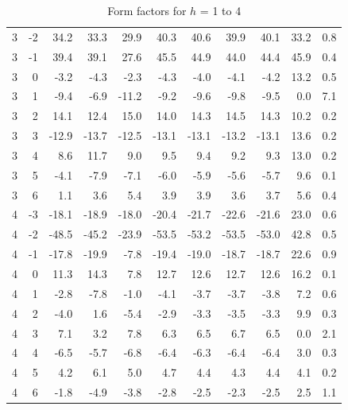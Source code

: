 \begin{table}[htbp]
\begin{tabular}{rrrrrrrrrrr}
3 & -2 & 34.2 & 33.3 & 29.9 & 40.3 & 40.6 & 39.9 & 40.1 & 33.2 & 0.8 \\ 
3 & -1 & 39.4 & 39.1 & 27.6 & 45.5 & 44.9 & 44.0 & 44.4 & 45.9 & 0.4 \\ 
3 & 0 & -3.2 & -4.3 & -2.3 & -4.3 & -4.0 & -4.1 & -4.2 & 13.2 & 0.5 \\ 
3 & 1 & -9.4 & -6.9 & -11.2 & -9.2 & -9.6 & -9.8 & -9.5 & 0.0 & 7.1 \\ 
3 & 2 & 14.1 & 12.4 & 15.0 & 14.0 & 14.3 & 14.5 & 14.3 & 10.2 & 0.2 \\ 
3 & 3 & -12.9 & -13.7 & -12.5 & -13.1 & -13.1 & -13.2 & -13.1 & 13.6 & 0.2 \\ 
3 & 4 & 8.6 & 11.7 & 9.0 & 9.5 & 9.4 & 9.2 & 9.3 & 13.0 & 0.2 \\ 
3 & 5 & -4.1 & -7.9 & -7.1 & -6.0 & -5.9 & -5.6 & -5.7 & 9.6 & 0.1 \\ 
3 & 6 & 1.1 & 3.6 & 5.4 & 3.9 & 3.9 & 3.6 & 3.7 & 5.6 & 0.4 \\ 
4 & -3 & -18.1 & -18.9 & -18.0 & -20.4 & -21.7 & -22.6 & -21.6 & 23.0 & 0.6 \\ 
4 & -2 & -48.5 & -45.2 & -23.9 & -53.5 & -53.2 & -53.5 & -53.0 & 42.8 & 0.5 \\ 
4 & -1 & -17.8 & -19.9 & -7.8 & -19.4 & -19.0 & -18.7 & -18.7 & 22.6 & 0.9 \\ 
4 & 0 & 11.3 & 14.3 & 7.8 & 12.7 & 12.6 & 12.7 & 12.6 & 16.2 & 0.1 \\ 
4 & 1 & -2.8 & -7.8 & -1.0 & -4.1 & -3.7 & -3.7 & -3.8 & 7.2 & 0.6 \\ 
4 & 2 & -4.0 & 1.6 & -5.4 & -2.9 & -3.3 & -3.5 & -3.3 & 9.9 & 0.3 \\ 
4 & 3 & 7.1 & 3.2 & 7.8 & 6.3 & 6.5 & 6.7 & 6.5 & 0.0 & 2.1 \\ 
4 & 4 & -6.5 & -5.7 & -6.8 & -6.4 & -6.3 & -6.4 & -6.4 & 3.0 & 0.3 \\ 
4 & 5 & 4.2 & 6.1 & 5.0 & 4.7 & 4.4 & 4.3 & 4.4 & 4.1 & 0.2 \\ 
4 & 6 & -1.8 & -4.9 & -3.8 & -2.8 & -2.5 & -2.3 & -2.5 & 2.5 & 1.1 \\ 
\hline
\end{tabular}
  \caption{Form factors for $h$ = 1 to 4}
  \label{tb:LAXS_fits}
\end{table}

